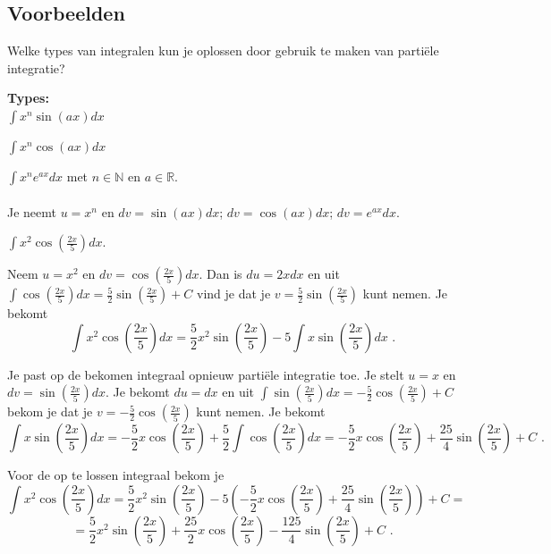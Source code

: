 \subsection{Voorbeelden}

Welke types van integralen kun je oplossen door gebruik te maken van parti\"ele integratie?


\begin{ftrekenregel}
	\textbf{Types:} \\

$\int x^n \sin(ax)dx$

$\int x^n \cos (ax)dx$ 

$\int x^n e^{ax}dx$ met $n \in \mathbb{N}$ en $a \in \mathbb{R}$.
\\
\\
Je neemt $u=x^n$ en $dv=\sin (ax)dx$; $dv=\cos (ax)dx$; $dv=e^{ax}dx$.\\

\end{ftrekenregel}

\begin{voorbeeld}
	$\int x^2 \cos \left( \frac{2x}{5}  \right)dx$.
	
	Neem $u=x^2$ en $dv=\cos \left( \frac{2x}{5}  \right)dx$.
	Dan is $du=2xdx$ en uit $\int \cos \left( \frac{2x}{5}  \right)dx=\frac{5}{2} \sin \left(  \frac{2x}{5} \right)+C$ vind je dat je $v=\frac{5}{2} \sin \left(  \frac{2x}{5} \right)$ kunt nemen.
	Je bekomt
	\[
	\int x^2 \cos \left( \frac{2x}{5}  \right)dx=\frac{5}{2}x^2  \sin \left(  \frac{2x}{5} \right)-5\int x  \sin \left(  \frac{2x}{5} \right)dx \text { .}
	\]
	
	Je past op de bekomen integraal opnieuw parti\"ele integratie toe.
	Je stelt $u=x$ en $dv= \sin \left(  \frac{2x}{5} \right)dx$.
	Je bekomt $du=dx$ en uit $\int  \sin \left(  \frac{2x}{5} \right)dx=-\frac{5}{2}\cos \left(  \frac{2x}{5} \right)+C$ bekom je dat je $v=-\frac{5}{2}\cos \left(  \frac{2x}{5} \right)$ kunt nemen.
	Je bekomt
	\[
	\int x  \sin \left(  \frac{2x}{5} \right)dx=-\frac{5}{2} x \cos \left(  \frac{2x}{5} \right)+\frac{5}{2}\int \cos \left( \frac{2x}{5}  \right)dx=-\frac{5}{2} x \cos \left(  \frac{2x}{5} \right)+\frac{25}{4}\sin \left( \frac{2x}{5} \right)+C \text { .}
	\]
	
	Voor de op te lossen integraal bekom je
	\[
	\int x^2 \cos \left( \frac{2x}{5}  \right)dx=\frac{5}{2}x^2  \sin \left(  \frac{2x}{5} \right)-5\left( -\frac{5}{2} x \cos \left(  \frac{2x}{5} \right)+\frac{25}{4}\sin \left( \frac{2x}{5} \right)   \right)+C=
	\]
	\[
	=\frac{5}{2}x^2  \sin \left(  \frac{2x}{5} \right)+\frac{25}{2} x \cos \left(  \frac{2x}{5} \right)-\frac{125}{4}\sin \left( \frac{2x}{5} \right)  +C \text { .}
	\]\\
\end{voorbeeld}

